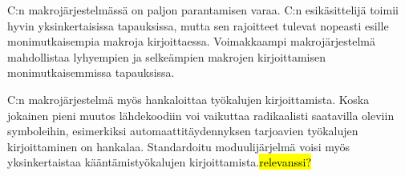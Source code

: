 C:n makrojärjestelmässä on paljon parantamisen varaa. C:n esikäsittelijä toimii
hyvin yksinkertaisissa tapauksissa, mutta sen rajoitteet tulevat nopeasti
esille monimutkaisempia makroja kirjoittaessa. Voimakkaampi makrojärjestelmä
mahdollistaa lyhyempien ja selkeämpien makrojen kirjoittamisen
monimutkaisemmissa tapauksissa.


C:n makrojärjestelmä myös hankaloittaa työkalujen kirjoittamista. Koska
jokainen pieni muutos lähdekoodiin voi vaikuttaa radikaalisti saatavilla
oleviin symboleihin, esimerkiksi automaattitäydennyksen tarjoavien työkalujen
kirjoittaminen on hankalaa. Standardoitu moduulijärjelmä voisi myös
yksinkertaistaa kääntämistyökalujen kirjoittamista.\hl{relevanssi?}
